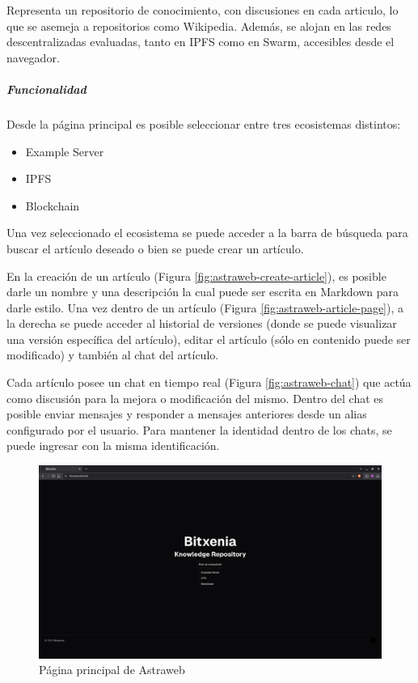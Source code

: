 Representa un repositorio de conocimiento, con discusiones en cada articulo, lo que se asemeja a repositorios como Wikipedia. Además, se alojan en las redes descentralizadas evaluadas, tanto en IPFS como en Swarm, accesibles desde el navegador.

\subparagraph{Funcionalidad}

Desde la página principal es posible seleccionar entre tres ecosistemas distintos:

\begin{itemize}
    \item Example Server
    \item IPFS
    \item Blockchain
\end{itemize}

Una vez seleccionado el ecosistema se puede acceder a la barra de búsqueda para buscar el artículo deseado o bien se puede crear un artículo.

En la creación de un artículo (Figura \ref{fig:astraweb-create-article}), es posible darle un nombre y una descripción la cual puede ser escrita en Markdown para darle estilo. Una vez dentro de un artículo (Figura \ref{fig:astraweb-article-page}), a la derecha se puede acceder al historial de versiones (donde se puede visualizar una versión específica del artículo), editar el artículo (sólo en contenido puede ser modificado) y también al chat del artículo.

Cada artículo posee un chat en tiempo real (Figura \ref{fig:astraweb-chat}) que actúa como discusión para la mejora o modificación del mismo. Dentro del chat es posible enviar mensajes y responder a mensajes anteriores desde un alias configurado por el usuario. Para mantener la identidad dentro de los chats, se puede ingresar con la misma identificación.

\begin{figure}[H]
    \centering
    \includegraphics[width=1\linewidth]{img/frontends/astraweb-main-page.png}
    \caption{Página principal de Astraweb}
    \label{fig:astraweb-main-page}
\end{figure}

